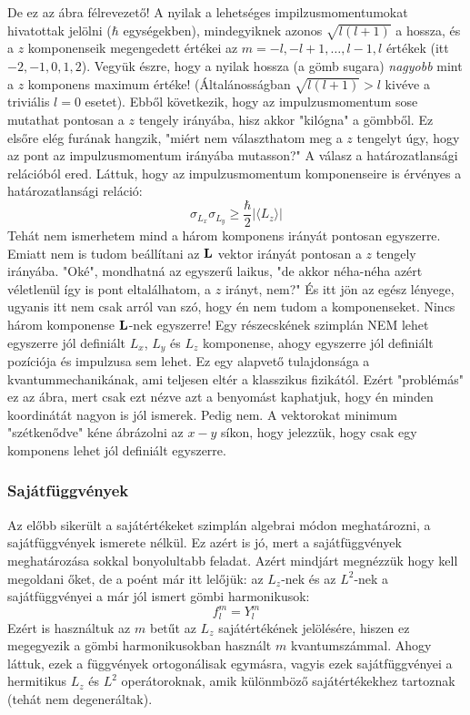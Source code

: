\documentclass[../main.tex]{subfiles}
\begin{document}
De ez az ábra félrevezető! A nyilak a lehetséges impilzusmomentumokat hivatottak jelölni ($\hbar$ egységekben), mindegyiknek azonos $\sqrt{l(l + 1)}$ a hossza, és a $z$ komponenseik megengedett értékei az $m = -l, -l+1, \ldots, l-1, l$ értékek (itt $-2, -1, 0, 1, 2$).
Vegyük észre, hogy a nyilak hossza (a gömb sugara) \textit{nagyobb} mint a $z$ komponens maximum értéke! (Általánosságban $\sqrt{l(l + 1)} > l$ kivéve a triviális $l=0$ esetet).
Ebből következik, hogy az impulzusmomentum sose mutathat pontosan a $z$ tengely irányába, hisz akkor "kilógna" a gömbből. Ez elsőre elég furának hangzik, "miért nem választhatom meg a $z$ tengelyt úgy,
hogy az pont az impulzusmomentum irányába mutasson?" A válasz a határozatlansági relációból ered. Láttuk, hogy az impulzusmomentum komponenseire is érvényes a határozatlansági reláció:
\begin{equation}
    \sigma_{L_x} \sigma_{L_y} \geq \frac{\hbar}{2} |\langle L_z \rangle|
\end{equation}
Tehát nem ismerhetem mind a három komponens irányát pontosan egyszerre. Emiatt nem is tudom beállítani az $\bold{L}$ vektor irányát pontosan a $z$ tengely irányába.
"Oké", mondhatná az egyszerű laikus, "de akkor néha-néha azért véletlenül így is pont eltalálhatom, a $z$ irányt, nem?" És itt jön az egész lényege, ugyanis itt nem csak arról van szó,
hogy én nem tudom a komponenseket. Nincs három komponense $\bold{L}$-nek egyszerre! Egy részecskének szimplán NEM lehet egyszerre jól definiált $L_x$, $L_y$ és $L_z$ komponense,
ahogy egyszerre jól definiált pozíciója és impulzusa sem lehet. Ez egy alapvető tulajdonsága a kvantummechanikának, ami teljesen eltér a klasszikus fizikától. Ezért "problémás" ez az ábra, 
mert csak ezt nézve azt a benyomást kaphatjuk, hogy én minden koordinátát nagyon is jól ismerek. Pedig nem. A vektorokat minimum "szétkenődve" kéne ábrázolni az $x-y$ síkon, hogy jelezzük, hogy csak egy komponens lehet jól definiált egyszerre.

\subsubsection*{Sajátfüggvények}
Az előbb sikerült a sajátértékeket szimplán algebrai módon meghatározni, a sajátfüggvények ismerete nélkül. Ez azért is jó, mert a sajátfüggvények meghatározása sokkal bonyolultabb feladat.
Azért mindjárt megnézzük hogy kell megoldani őket, de a poént már itt lelőjük: az $L_z$-nek és az $L^2$-nek a sajátfüggvényei a már jól ismert gömbi harmonikusok:
\begin{equation}
    f_l^m = Y_l^m
\end{equation}
Ezért is használtuk az $m$ betűt az $L_z$ sajátértékének jelölésére, hiszen ez megegyezik a gömbi harmonikusokban használt $m$ kvantumszámmal. Ahogy láttuk, ezek a függvények ortogonálisak egymásra,
vagyis ezek sajátfüggvényei a hermitikus $L_z$ és $L^2$ operátoroknak, amik különmböző sajátértékekhez tartoznak (tehát nem degeneráltak).
\end{document}
